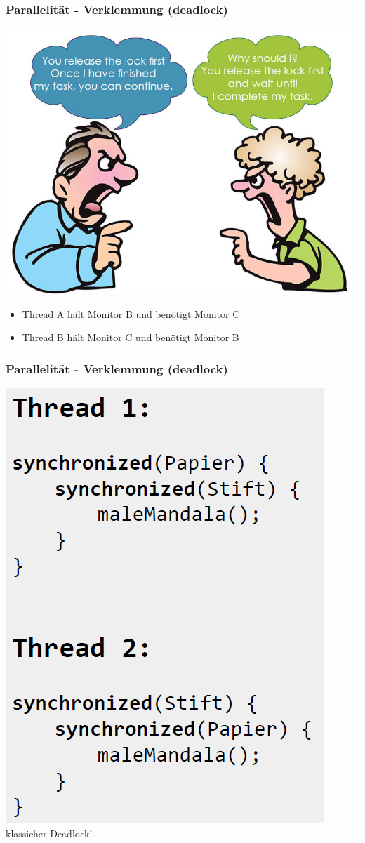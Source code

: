 \documentclass[18pt]{beamer}
\begin{document}
	\begin{frame}
		\frametitle{Parallelität - Verklemmung (deadlock)}
		\includegraphics[scale=0.3]{./pics/tut5/deadlock.jpg}
		\pause
		\begin{itemize}
			\item Thread A hält Monitor B und benötigt Monitor C
			\item Thread B hält Monitor C und benötigt Monitor B
		\end{itemize}
	\end{frame}

	\begin{frame}
		\frametitle{Parallelität - Verklemmung (deadlock)}
			\centering \includegraphics[scale=0.4]{./pics/tut5/deadlock-ex.png} \linebreak
			klassicher Deadlock!
	\end{frame}
\end{document}
